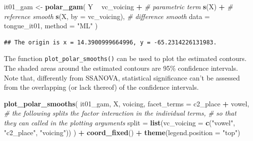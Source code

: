 \documentclass[12pt,]{article}
\newenvironment{Shaded}{\begin{snugshade}}{\end{snugshade}}
\newcommand{\CommentTok}[1]{\textcolor[rgb]{0.56,0.35,0.01}{\textit{#1}}}
\newcommand{\DataTypeTok}[1]{\textcolor[rgb]{0.13,0.29,0.53}{#1}}
\newcommand{\KeywordTok}[1]{\textcolor[rgb]{0.13,0.29,0.53}{\textbf{#1}}}
\newcommand{\NormalTok}[1]{#1}
\newcommand{\OperatorTok}[1]{\textcolor[rgb]{0.81,0.36,0.00}{\textbf{#1}}}
\newcommand{\StringTok}[1]{\textcolor[rgb]{0.31,0.60,0.02}{#1}}
\begin{document}
\begin{Shaded}
\begin{Highlighting}[]
\NormalTok{it01_gam <-}\StringTok{ }\KeywordTok{polar_gam}\NormalTok{(}
\NormalTok{  Y }\OperatorTok{~}
\StringTok{    }\NormalTok{vc_voicing }\OperatorTok{+}\StringTok{            }\CommentTok{# parametric term}
\StringTok{    }\KeywordTok{s}\NormalTok{(X) }\OperatorTok{+}\StringTok{                  }\CommentTok{# reference smooth}
\StringTok{    }\KeywordTok{s}\NormalTok{(X, }\DataTypeTok{by =}\NormalTok{ vc_voicing),  }\CommentTok{# difference smooth}
  \DataTypeTok{data =}\NormalTok{ tongue_it01,}
  \DataTypeTok{method =} \StringTok{"ML"}
\NormalTok{)}
\end{Highlighting}
\end{Shaded}

\begin{verbatim}
## The origin is x = 14.3900999664996, y = -65.2314226131983.
\end{verbatim}

The function \texttt{plot\_polar\_smooths()} can be used to plot the
estimated contours. The shaded areas around the estimated contours are
95\% confidence intervals. Note that, differently from SSANOVA,
statistical significance can't be assessed from the overlapping (or lack
thereof) of the confidence intervals.

\begin{Shaded}
\begin{Highlighting}[]
\KeywordTok{plot_polar_smooths}\NormalTok{(}
\NormalTok{  it01_gam,}
\NormalTok{  X,}
\NormalTok{  voicing,}
  \DataTypeTok{facet_terms =}\NormalTok{ c2_place }\OperatorTok{+}\StringTok{ }\NormalTok{vowel,}
  \CommentTok{# the following splits the factor interaction in the individual terms,}
  \CommentTok{# so that they can called in the plotting arguments}
  \DataTypeTok{split =} \KeywordTok{list}\NormalTok{(}\DataTypeTok{vc_voicing =} \KeywordTok{c}\NormalTok{(}\StringTok{"vowel"}\NormalTok{, }\StringTok{"c2_place"}\NormalTok{, }\StringTok{"voicing"}\NormalTok{))}
\NormalTok{) }\OperatorTok{+}
\StringTok{  }\KeywordTok{coord_fixed}\NormalTok{() }\OperatorTok{+}
\StringTok{  }\KeywordTok{theme}\NormalTok{(}\DataTypeTok{legend.position =} \StringTok{"top"}\NormalTok{)}
\end{Highlighting}
\end{Shaded}
\end{document}
